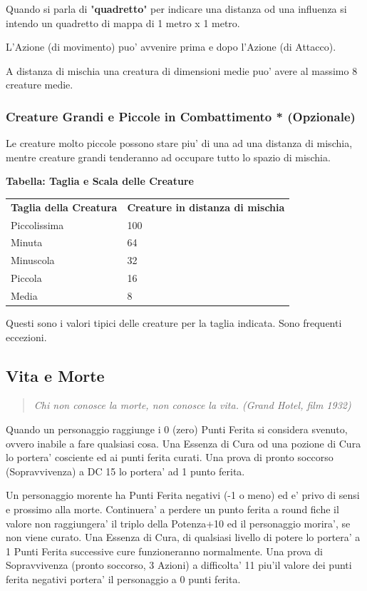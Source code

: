 \documentclass[a4paper,11pt,twoside,openany]{book}
\begin{document}
Quando si parla di "\textbf{quadretto}" per indicare una distanza od una influenza si intendo un quadretto di mappa di 1 metro x 1 metro.

L'Azione (di movimento) puo' avvenire prima e dopo l'Azione (di Attacco).

A distanza di mischia una creatura di dimensioni medie puo' avere al massimo 8 creature medie.


\subsubsection{Creature Grandi e Piccole in Combattimento {*} (Opzionale)}

\label{creature-grandi-e-piccole-in-combattimento-opzionale}

Le creature molto piccole possono stare piu' di una ad una distanza di mischia, mentre creature grandi tenderanno ad occupare tutto lo spazio di mischia.

\medskip

\textbf{Tabella: Taglia e Scala delle Creature}

\medskip
\begin{tabular}{ll}
	\toprule 
	\textbf{Taglia della Creatura} & \textbf{Creature in distanza di mischia}\tabularnewline
	Piccolissima & 100\tabularnewline
	Minuta & 64\tabularnewline
	Minuscola & 32\tabularnewline
	Piccola & 16\tabularnewline
	Media & 8\tabularnewline	
\end{tabular}

\smallskip
Questi sono i valori tipici delle creature per la taglia indicata.
Sono frequenti eccezioni.
\bigskip

\pagebreak

\subsection{Vita e Morte}

\label{vita-e-morte}
\begin{quote}\textit{Chi non conosce la morte, non conosce la vita. (Grand Hotel, film 1932)
}\end{quote}

Quando un personaggio raggiunge i 0 (zero) Punti Ferita si considera svenuto, ovvero inabile a fare qualsiasi cosa. Una Essenza di Cura od una pozione di Cura lo portera’ cosciente ed ai punti ferita curati. Una prova di pronto soccorso (Sopravvivenza) a DC 15 lo portera’ ad 1 punto ferita.

Un personaggio morente ha Punti Ferita negativi (-1 o meno) ed e' privo di sensi e prossimo alla morte. Continuera’ a perdere un punto ferita a round fiche il valore non raggiungera’ il triplo della Potenza+10 ed il personaggio morira’, se non viene curato.
Una Essenza di Cura, di qualsiasi livello di potere lo portera’ a 1 Punti Ferita successive cure funzioneranno normalmente.
Una prova di Sopravvivenza (pronto soccorso, 3 Azioni) a difficolta’ 11 piu’il valore dei punti ferita negativi portera’ il personaggio a 0 punti ferita.
\end{document}
